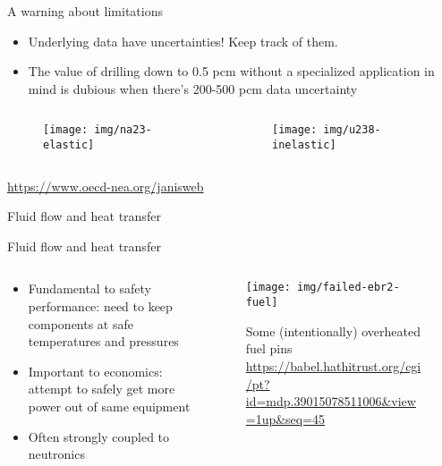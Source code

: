 \documentclass[pdf,aspectratio=169]{beamer}
\begin{document}
\begin{frame}{A warning about limitations}
        \begin{itemize}
            \item Underlying data have uncertainties! Keep track of them.
            \item The value of drilling down to 0.5 pcm without a specialized application
                in mind is dubious when there's 200-500 pcm data uncertainty
        \end{itemize}
\begin{columns}
    \begin{column}{0.5\textwidth}
        \begin{figure}[ht]
        \centering
            \texttt{[image: img/na23-elastic]}
        \end{figure}
    \end{column}
    \begin{column}{0.5\textwidth}
        \begin{figure}[ht]
        \centering
            \texttt{[image: img/u238-inelastic]}
        \end{figure}
    \end{column}
\end{columns}
    \centering \tiny \url{https://www.oecd-nea.org/janisweb}
\end{frame}


\begin{frame}[plain,c]
	\begin{center}
	\Huge Fluid flow and heat transfer
	\end{center}
\end{frame}

\begin{frame}{Fluid flow and heat transfer}
\begin{columns}
    \begin{column}{0.5\textwidth}
        \begin{itemize}
            \item Fundamental to safety performance: need to keep components at safe
                temperatures and pressures
            \item Important to economics: attempt to safely get more power out of same
                equipment
            \item Often strongly coupled to neutronics
        \end{itemize}
    \end{column}
    \begin{column}{0.5\textwidth}
        \begin{figure}[ht]
        \centering
            \texttt{[image: img/failed-ebr2-fuel]}
            \caption{\tiny Some (intentionally) overheated fuel pins \url{https://babel.hathitrust.org/cgi/pt?id=mdp.39015078511006&view=1up&seq=45}}
        \end{figure}
    \end{column}
    \end{columns}
\end{frame}
\end{document}
